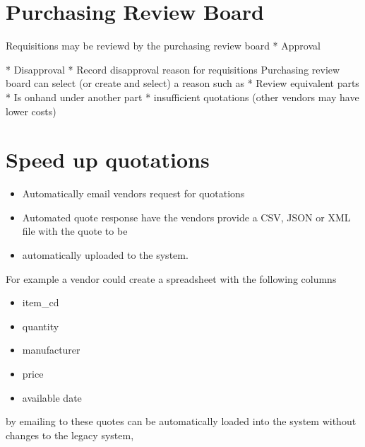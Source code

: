 \documentclass[letterpaper,10pt,english]{sphinxmanual}
\begin{document}
\section{Purchasing Review Board}
\label{\detokenize{BusinessProcessReengineering:purchasing-review-board}}
\begin{DUlineblock}{0em}
\item[] Requisitions may be reviewd by the purchasing review board * Approval
\end{DUlineblock}

* Disapproval
\textbar{}  * Record disapproval reason for requisitions Purchasing review board
can select (or create and select) a reason such as
\textbar{}  * Review equivalent parts * Is onhand under another part *
insufficient quotations (other vendors may have lower costs)


\section{Speed up quotations}
\label{\detokenize{BusinessProcessReengineering:speed-up-quotations}}\begin{itemize}
\item {} 
Automatically email vendors request for quotations

\item {} 
Automated quote response have the vendors provide a CSV, JSON or XML
file with the quote to be

\item {} 
automatically uploaded to the system.

\end{itemize}

For example a vendor could create a spreadsheet with the following
columns
\begin{itemize}
\item {} 
item\_cd

\item {} 
quantity

\item {} 
manufacturer

\item {} 
price

\item {} 
available date

\end{itemize}

by emailing to  these quotes can be automatically
loaded into the system without changes to the legacy system,
\end{document}
